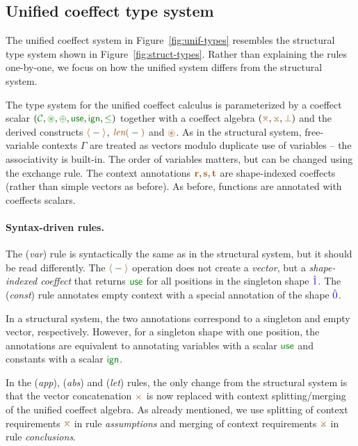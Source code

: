 \subsection{Unified coeffect type system}
\label{sec:unified-types}
The unified coeffect system in Figure~\ref{fig:unif-types} resembles the structural type system
shown in Figure~\ref{fig:struct-types}. Rather than explaining the rules one-by-one, we focus on
how the unified system differs from the structural system.

The type system for the unified coeffect calculus is parameterized by a coeffect scalar 
$(\C, \cseq, \cpar, \cunit, \czero, \cleq)$ together with a coeffect algebra $(\azip, \apar, \azero)$ 
and the derived constructs $\alift{-}$, $\alen{-}$ and $\aseq$. 
As in the structural system, free-variable contexts $\Gamma$ are treated as vectors modulo duplicate
use of variables -- the associativity is built-in. The order of variables matters, but can be changed 
using the exchange rule. The context annotations $\aclrd{\textbf{r}}, \aclrd{\textbf{s}}, \aclrd{\textbf{t}}$ 
are shape-indexed coeffects (rather than simple vectors as before). As before, functions are
annotated with coeffects scalars.

\paragraph{Syntax-driven rules.} 
The (\emph{var}) rule is syntactically the same as in the structural system, but it should be read
differently. The $\alift{-}$ operation does not create a \emph{vector}, but a \emph{shape-indexed
coeffect} that returns $\cunit$ for all positions in the singleton shape $\sunit$. 
The (\emph{const}) rule annotates empty context with a special annotation of the shape $\sempty$.

In a structural system, the two annotations correspond to a singleton and empty vector, respectively.
However, for a singleton shape with one position, the annotations are equivalent to annotating
variables with a scalar $\cunit$ and constants with a scalar $\czero$.

In the (\emph{app}), (\emph{abs}) and (\emph{let}) rules, the only change from the structural
system is that the vector concatenation $\atimes$ is now replaced with context splitting/merging 
of the unified coeffect algebra. As already mentioned, we use splitting of context requirements $\azip$
in rule \emph{assumptions} and merging of context requirements $\apar$ in rule \emph{conclusions}.

